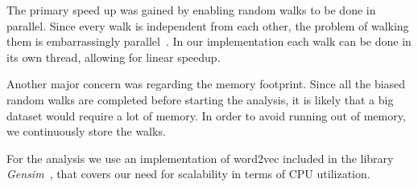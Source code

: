 The primary speed up was gained by enabling random walks to be done in parallel. Since every walk is independent from each other, the problem of walking them is embarrassingly parallel~\cite{matloff2011art}. In our implementation each walk can be done in its own thread, allowing for linear speedup.


Another major concern was regarding the memory footprint. Since all the biased random walks are completed before starting the analysis, it is likely that a big dataset would require a lot of memory. In order to avoid running out of memory, we continuously store the walks.

For the analysis we use an implementation of word2vec included in the library \emph{Gensim}~\cite{rehurek_lrec}, that covers our need for scalability in terms of CPU utilization.
